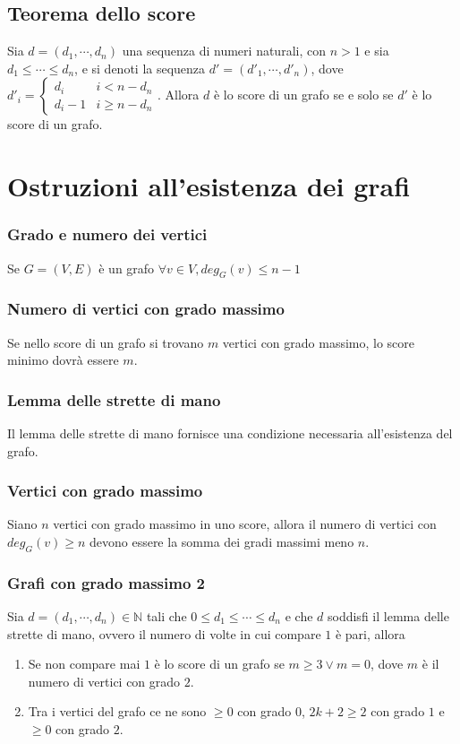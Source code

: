 \subsection{Teorema dello score}
Sia $d=(d_1,\cdots, d_n)$ una sequenza di numeri naturali, con $n>1$ e sia $d_1\le\cdots\le d_n$, e si denoti la sequenza $d'=(d'_1,\cdots, d'_n)$, dove $d'_i=\begin{cases}
d_i&i<n-d_n\\d_i-1&i\ge n-d_n\end{cases}$. Allora $d$ \`e lo score di un grafo se e solo se $d'$ \`e lo score di un grafo. 
\section{Ostruzioni all'esistenza dei grafi}
\subsubsection{Grado e numero dei vertici}
Se $G=(V,E)$ \`e un grafo $\forall v\in V,deg_G(v)\le n-1 $
\subsubsection{Numero di vertici con grado massimo}
Se nello score di un grafo si trovano $m$ vertici con grado massimo, lo score minimo dovr\`a essere $m$. 
\subsubsection{Lemma delle strette di mano}
Il lemma delle strette di mano fornisce una condizione necessaria all'esistenza del grafo.
\subsubsection{Vertici con grado massimo}
Siano $n$ vertici con grado massimo in uno score, allora il numero di vertici con $deg_G(v)\ge n$ devono essere la somma dei gradi massimi meno $n$.
\subsubsection{Grafi con grado massimo 2}
Sia $d=(d_1,\cdots, d_n)\in\mathbb{N}$ tali che $0\le d_1\le\cdots\le d_n$ e che $d$ soddisfi il lemma delle strette di mano, ovvero il numero di volte in cui compare $1$ \`e 
pari, allora 
\begin{enumerate}
\item Se non compare mai $1$ \`e lo score di un grafo se $m\ge 3\lor m=0$, dove $m$ \`e il numero di vertici con grado $2$.
\item Tra i vertici del grafo ce ne sono $\ge 0$ con grado $0$, $2k+2\ge 2$ con grado $1$ e $\ge 0$ con grado $2$. 
\end{enumerate}
